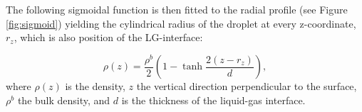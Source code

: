 The following sigmoidal function is then fitted to the radial profile
(see Figure \ref{fig:sigmoid}) yielding the cylindrical radius of
the droplet at every z-coordinate, $r_{z}$, which is also position
of the LG-interface:

\begin{equation}
\rho(z)=\frac{\rho^{b}}{2}(1-\tanh\frac{2(z-r_{z})}{d}),\label{eq:sigmoid}
\end{equation}
where $\rho(z)$ is the density, $z$ the vertical direction perpendicular
to the surface, $\rho^{b}$ the bulk density, and $d$ is the thickness
of the liquid-gas interface.